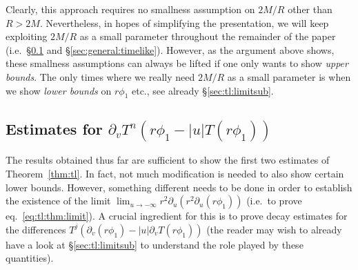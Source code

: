 \documentclass[11pt,english]{article}
\numberwithin{equation}{section}
\theoremstyle{remark}
\theoremstyle{plain}
\theoremstyle{remark}
\newcommand{\pu}{\partial_u}
\newcommand{\pv}{\partial_v}
\renewcommand{\(}{\left(}
\renewcommand{\)}{\right)}
\newcommand{\pho}{(r\phi_1)}
\begin{document}
Clearly, this approach requires no smallness assumption on $2M/R$ other than $R>2M$.
 Nevertheless, in hopes of simplifying the presentation, we will keep exploiting $2M/R$ as a small parameter throughout the remainder of the paper (i.e.\ \S\ref{sec:tl:pvT-T2} and \S \ref{sec:general:timelike}). 
 However, as the argument above shows, these smallness assumptions can always be lifted if one only wants to show \textit{upper bounds}. 
 The only times where we really need $2M/R$ as a small parameter is when we show \textit{lower bounds} on $r\phi_1$ etc., see already \S \ref{sec:tl:limitsub}.

\subsection{Estimates for \texorpdfstring{$\pv T^n(r\phi_1-|u|T(r\phi_1))$}{d/dv(Tn(r phi1+u T(r phi1))}}\label{sec:tl:pvT-T2}
The results obtained thus far are sufficient to show the first two estimates of Theorem~\ref{thm:tl}. 
In fact, not much modification is needed to also show certain lower bounds. 
However, something different needs to be done in order to establish the existence of the limit $\lim_{u\to-\infty}r^2\pu(r^2\pu\pho)$ (i.e.\ to prove eq.\ \eqref{eq:tl:thm:limit}).
 A crucial ingredient for this is to prove decay estimates for the differences $T^j(\pv(r\phi_1)-|u|\pv T(r\phi_1))$ (the reader may wish to already have a look at \S\ref{sec:tl:limitsub} to understand the role played by these quantities).
\end{document}

